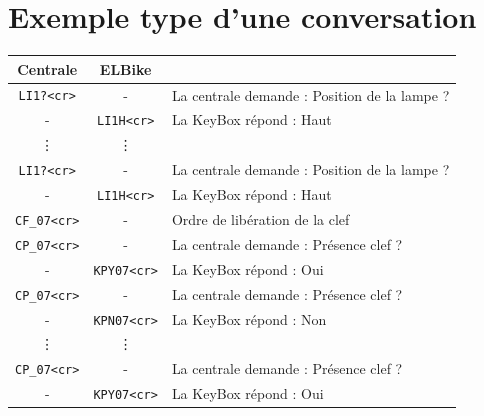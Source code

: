 \documentclass[a4paper, 10pt]{article} %
\newcommand{\rien}{-}
\begin{document}
\section{Exemple type d'une conversation}
\begin{center}
\begin{tabular}{|c|c|p{6cm}|}
\hline
Centrale&ELBike&\\
\hline
\hline
\verb|LI1?<cr>|&\rien& La centrale demande : Position de la lampe ?\\
\rien&\verb|LI1H<cr>|& La KeyBox répond : Haut\\
\hline
\vdots&\vdots& 	\\
\hline
\verb|LI1?<cr>|&\rien& La centrale demande : Position de la lampe ?\\
\rien&\verb|LI1H<cr>|& La KeyBox répond : Haut\\
\hline
\verb|CF_07<cr>|&\rien& Ordre de libération de la clef\\
\hline
\verb|CP_07<cr>|&\rien& La centrale demande : Présence clef ?\\
\rien&\verb|KPY07<cr>|& La KeyBox répond : Oui\\
\hline
\verb|CP_07<cr>|&\rien& La centrale demande : Présence clef ?\\
\rien&\verb|KPN07<cr>|&La KeyBox répond : Non\\
\hline
\vdots&\vdots&\\
\hline
\verb|CP_07<cr>|&\rien& La centrale demande : Présence clef ?\\
\rien&\verb|KPY07<cr>|& La KeyBox répond : Oui\\
\hline
\end{tabular}
\end{center}
\end{document}
